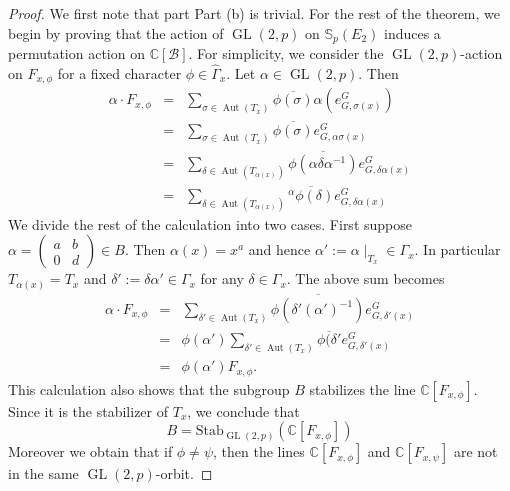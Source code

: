 \documentclass[12pt]{article}
\theoremstyle{plain}
\theoremstyle{definition}
\newcommand{\kerlin}{\mathbb S_p}
\newcommand{\Aut}{\operatorname{Aut}}
\newcommand{\gl}{{\operatorname{GL}(2, p)}}
\begin{document}
\begin{proof} We first note that part Part {\rm (b)} is trivial. For the rest of the theorem, we begin by proving that the action of $\gl$ on $\kerlin(E_2)$ induces a permutation action on $\mathbb C[\mathcal B]$. For simplicity, we consider the $\gl$-action on $F_{x, \phi}$ for a fixed character $\phi\in\hat\Gamma_x$. Let $\alpha\in\gl$. Then
\begin{eqnarray*}
    \alpha\cdot F_{x,\phi} &=& \sum_{\sigma\in\Aut(T_x)}\overline{\phi(\sigma)} \alpha(e_{G, \sigma(x)}^G)\\
    &=& \sum_{\sigma\in\Aut(T_x)}\overline{\phi(\sigma)} e_{G, \alpha\sigma(x)}^G\\
    &=& \sum_{\delta\in\Aut(T_{\alpha(x)})}\overline{\phi(\alpha\delta\alpha^{-1})} e_{G, \delta\alpha(x)}^G\\
    &=& \sum_{\delta\in\Aut(T_{\alpha(x)})}\overline{{}^\alpha\phi(\delta)} e_{G, \delta\alpha(x)}^G
\end{eqnarray*}
We divide the rest of the calculation into two cases. First suppose $\alpha = \begin{pmatrix}
    a & b\\ 0 & d
\end{pmatrix}\in B$. Then $\alpha(x) = x^a$ and hence $\alpha' :=\alpha\mid_{T_x}\in\Gamma_x$. In particular $T_{\alpha(x)} = T_x$ and $\delta':= \delta\alpha'\in\Gamma_x$ for any $\delta\in\Gamma_x$. The above sum becomes
\begin{eqnarray*}
  \alpha\cdot F_{x,\phi} &=&\sum_{\delta'\in\Aut(T_{x})}\overline{\phi(\delta'(\alpha')^{-1})} e_{G, \delta'(x)}^G\\
&=&\phi(\alpha')\sum_{\delta'\in\Aut(T_{x})}\overline{\phi(\delta'} e_{G, \delta'(x)}^G\\
&=& \phi(\alpha') F_{x, \phi}.
\end{eqnarray*}
This calculation also shows that the subgroup $B$ stabilizes the line $\mathbb C[F_{x, \phi}]$. Since it is the stabilizer of $T_x$, we conclude that 
\[
B = \text{Stab}_{\gl}(\mathbb C[F_{x, \phi}])
\]
Moreover we obtain that if $\phi\not = \psi$, then the lines $\mathbb C[F_{x, \phi}]$ and $\mathbb C[F_{x, \psi}]$ are not in the same $\gl$-orbit.


\end{proof}
\end{document}
